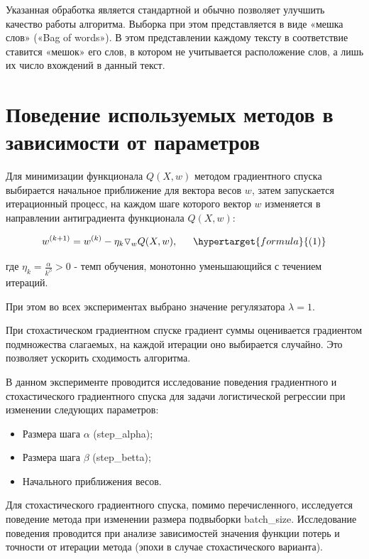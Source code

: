 \documentclass{article}
\begin{document}
Указанная обработка является стандартной и обычно позволяет улучшить качество работы алгоритма.
Выборка при этом представляется в виде «мешка слов» («Bag of words»). В этом представлении каждому тексту в соответствие ставится «мешок» его слов, в котором не учитывается расположение слов, а лишь их число вхождений в данный текст.


\section{Поведение используемых методов в зависимости от параметров}

Для минимизации функционала $Q(X, w)$  методом градиентного спуска выбирается начальное приближение для вектора весов $w$, затем запускается итерационный процесс, на каждом шаге которого вектор $w$ изменяется в направлении антиградиента функционала $Q(X, w)$:

$$w^{(k+1)}=w^{(k)}-\eta_k\triangledown_wQ(X,w), \:\:\:\:\:\:\: \hypertarget{formula}{(1)}$$


где $\eta_k=\frac{\alpha}{k^\beta}>0$ - темп обучения, монотонно уменьшающийся с течением итераций.

При этом во всех экспериментах выбрано значение регулязатора $\lambda=1$.

При стохастическом градиентном спуске градиент суммы оценивается градиентом подмножества слагаемых, на каждой итерации оно выбирается случайно. Это позволяет ускорить сходимость алгоритма.

В данном эксперименте проводится исследование поведения градиентного и стохастического градиентного спуска для задачи логистической регрессии при изменении следующих параметров:

\begin{itemize}
  \item Размера шага $\alpha$ (step\_alpha);
  \item Размера шага $\beta$ (step\_betta);
  \item Начального приближения весов.
\end{itemize}

Для стохастического градиентного спуска, помимо перечисленного, исследуется поведение метода при изменении размера подвыборки batch\_size.
Исследование поведения проводится при анализе зависимостей значения функции потерь и точности от итерации метода (эпохи в случае стохастического варианта). 
\end{document}
